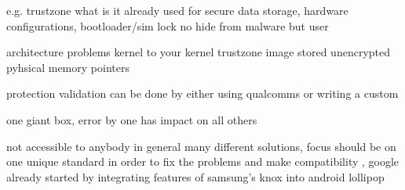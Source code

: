 %
e.g. trustzone
what is it already used for
secure data storage, hardware configurations, bootloader/sim lock
no hide from malware but user

architecture problems
kernel to your kernel
trustzone image stored unencrypted
pyhsical memory pointers

protection
validation can be done by either using qualcomms or writing a custom

one giant box, error by one has impact on all others

\cite{dragonTZ}\cite{armTz}
%

not accessible to anybody
in general many different solutions, focus should be on one unique standard in order to fix the problems and make compatibility , google already started by integrating features of samsung's knox into android lollipop \cite{samsungKnox}
